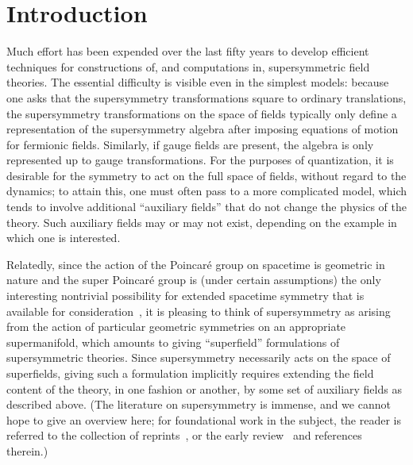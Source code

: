 \documentclass[pdftex]{sigma}
\numberwithin{equation}{section}
\begin{document}


\section{Introduction}

Much effort has been expended over the last fifty years to develop efficient techniques for constructions of, and computations in, supersymmetric field theories. The essential difficulty is visible even in the simplest models: because one asks that the supersymmetry transformations square to ordinary translations, the supersymmetry transformations on the space of fields typically only define a representation of the supersymmetry algebra after imposing equations of motion for fermionic fields. Similarly, if gauge fields are present, the algebra is only represented up to gauge transformations.
For the purposes of quantization, it is desirable for the symmetry to act on the full space of fields, without regard to the dynamics; to attain this, one must often pass to a more complicated model, which tends to involve additional ``auxiliary fields'' that do not change the physics of the theory. Such auxiliary fields may or may not exist, depending on the example in which one is interested.

Relatedly, since the action of the Poincar\'e group on spacetime is geometric in nature and the super Poincar\'e group is (under certain assumptions) the only interesting nontrivial possibility for extended spacetime symmetry that is available for consideration~\cite{HLS}, it is pleasing to think of supersymmetry as arising from the action of particular geometric symmetries on an appropriate supermanifold, which amounts to giving ``superfield'' formulations of supersymmetric theories.
Since supersymmetry necessarily acts on the space of superfields, giving such a formulation implicitly requires extending the field content of the theory, in one fashion or another, by some set of auxiliary fields as described above.
(The literature on supersymmetry is immense, and we cannot hope to give an overview here; for foundational work in the subject, the reader is referred to the collection of reprints~\cite{FerraraBook}, or the early review~\cite{Sohnius} and references therein.)
\end{document}
